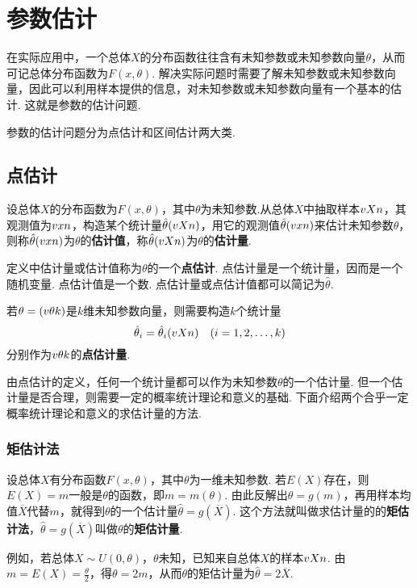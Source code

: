 \chapter{参数估计}
在实际应用中，一个总体\(X\)的分布函数往往含有未知参数或未知参数向量\(\theta\)，从而可记总体分布函数为\(F(x,\theta)\).
解决实际问题时需要了解未知参数或未知参数向量，因此可以利用样本提供的信息，对未知参数或未知参数向量有一个基本的估计.
这就是参数的估计问题.

参数的估计问题分为点估计和区间估计两大类.

\section{点估计}
\begin{definition}
设总体\(X\)的分布函数为\(F(x,\theta)\)，其中\(\theta\)为未知参数.从总体\(X\)中抽取样本\(v{X}{n}\)，其观测值为\(v{x}{n}\)，构造某个统计量\(\hat{\theta}(v{X}{n})\)，用它的观测值\(\hat{\theta}(v{x}{n})\)来估计未知参数\(\theta\)，则称\(\hat{\theta}(v{x}{n})\)为\(\theta\)的\textbf{估计值}，称\(\hat{\theta}(v{X}{n})\)为\(\theta\)的\textbf{估计量}.

定义中估计量或估计值称为\(\theta\)的一个\textbf{点估计}.
点估计量是一个统计量，因而是一个随机变量.
点估计值是一个数.
点估计量或点估计值都可以简记为\(\hat{\theta}\).

若\(\theta=(v{\theta}{k})\)是\(k\)维未知参数向量，则需要构造\(k\)个统计量\[
\hat{\theta}_i = \hat{\theta}_i(v{X}{n}) \quad(i=1,2,\dotsc,k)
\]分别作为\(v{\theta}{k}\)的\textbf{点估计量}.
\end{definition}

由点估计的定义，任何一个统计量都可以作为未知参数\(\theta\)的一个估计量.
但一个估计量是否合理，则需要一定的概率统计理论和意义的基础.
下面介绍两个合乎一定概率统计理论和意义的求估计量的方法.

\subsection{矩估计法}
设总体\(X\)有分布函数\(F(x,\theta)\)，其中\(\theta\)为一维未知参数.
若\(E(X)\)存在，则\(E(X)=m\)一般是\(\theta\)的函数，即\(m=m(\theta)\).
由此反解出\(\theta=g(m)\)，再用样本均值\(\overline{X}\)代替\(m\)，就得到\(\theta\)的一个估计量\(\hat{\theta}=g(\overline{X})\).
这个方法就叫做求估计量的的\textbf{矩估计法}，\(\hat{\theta}=g(\overline{X})\)叫做\(\theta\)的\textbf{矩估计量}.

例如，若总体\(X \sim U(0,\theta)\)，\(\theta\)未知，已知来自总体\(X\)的样本\(v{X}{n}\).
由\(m = E(X) = \frac{\theta}{2}\)，得\(\theta=2m\)，从而\(\theta\)的矩估计量为\(\hat{\theta} = 2\overline{X}\).

